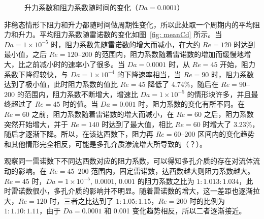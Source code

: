 \begin{figure}
	\setlength{\subfigcapskip}{-1bp}
	\centering
	\begin{minipage}{\textwidth}
		\centering
	\end{minipage}
	\centering
	\begin{minipage}{\textwidth}
		\centering
	\end{minipage}
	\centering
	\begin{minipage}{\textwidth}
		\centering
	\end{minipage}
	\centering
	\begin{minipage}{\textwidth}
		\centering
	\end{minipage}
	\vspace{0.2em}
	\caption{升力系数和阻力系数随时间的变化（$Da=0.0001$）}
	\label{fig: ClCd_t-1e-4}
\end{figure}

非稳态情形下阻力和升力都随时间做周期性变化，所以此处取一个周期内的平均阻力和升力。平均阻力系数随雷诺数的变化如图~\ref{fig: meanCd} 所示。当 $Da=1\times 10^{-5}$ 时，阻力系数先随雷诺数的增大而减小，在大约 $Re=120$ 时达到最小值，之后 $Re=120$--$200$ 的范围内，阻力系数随着雷诺数的增加而缓慢地增大，比之前减小时的速率小了很多。当 $Da=0.0001$ 时，从 $Re=45$ 开始，阻力系数下降得较快，与 $Da=1\times 10^{-4}$ 的下降速率相当，当 $Re=90$ 时，阻力系数达到了极小值，此时阻力系数的值比 $Re=45$ 降低了 4.74\%，随后在 $Re=90$--$200$ 的范围内，阻力系数不断增大，增速比 $Da=1\times 10^{-5}$ 的情形块许多，并且最终超过了 $Re=45$ 时的值。当 $Da=0.001$ 时，阻力系数的变化有所不同。在 $Re=60$ 之前，阻力系数随着雷诺数的增大而减小，在 $Re=60$ 之后，阻力系数突然开始增大，并于 $Re=140$ 时达到了最大值，相比 $Re=60$ 时增大了 3.23\%，随后才逐渐下降。所以，在该达西数下，阻力再 $Re=60$--$200$ 区间内的变化趋势和其他情形完全相反，可能是多孔介质渗流增大所导致的（？）。

观察同一雷诺数下不同达西数对应的阻力系数，可以得知多孔介质的存在对流体流动的影响。在 $Re=45$--$200$ 范围内，固定雷诺数，达西数越大则阻力系数越大。$Re=45$ 时，$Da=1\times 10^{-5},\,0.0001,\,0.001$ 的阻力系数之比为 $1:1.013:1.034$，此时雷诺数很小，多孔介质的影响并不明显。随着雷诺数的增大，这一差距也逐渐拉大，$Re=120$ 时，三者之比达到了 $1:1.05:1.15$，$Re=200$ 时的比例为 $1:1.10:1.11$，由于 $Da=0.0001$ 和 0.001 变化趋势相反，所以二者逐渐接近。

